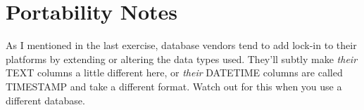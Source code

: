 \section{Portability Notes}

As I mentioned in the last exercise, database vendors tend to add lock-in
to their platforms by extending or altering the data types used.  They'll
subtly make \emph{their} TEXT columns a little different here, or \emph{their}
DATETIME columns are called TIMESTAMP and take a different format.  Watch
out for this when you use a different database.

